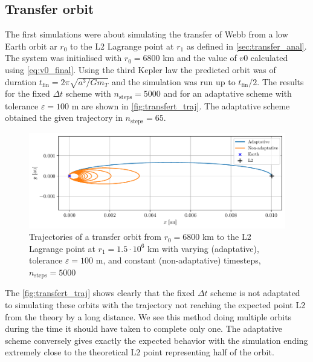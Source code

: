 \subsection{Transfer orbit}
The first simulations were about simulating the transfer of Webb from a low Earth orbit ar $r_0$ to the L2 Lagrange point at $r_1$ as defined in \autoref{sec:transfer_anal}. The system was initialised with \(r_0 = 6800\) km and the value of $v0$ calculated using \autoref{eq:v0_final}. Using the third Kepler law the predicted orbit was of duration $t_\mathrm{fin} = 2\pi\sqrt{a^3/Gm_T}$ and the simulation was run up to $t_\mathrm{fin}/2$. The results for the fixed $\Delta t$ scheme with $n_\mathrm{steps} = 5000$ and for an adaptative scheme with tolerance $\varepsilon = 100$ \si{\meter} are shown in \autoref{fig:transfert_traj}. The adaptative scheme obtained the given trajectory in $n_\mathrm{steps} = 65$.
\begin{figure}[h]
    \centering
    \includegraphics[width=\linewidth]{figures/transfert_comparaison.pdf}
    \caption{Trajectories of a transfer orbit from $r_0 = 6800$ \si{\kilo\meter} to the L2 Lagrange point at $r_1 = 1.5 \cdot 10^6$ \si{\kilo\meter} with varying (adaptative), tolerance $\varepsilon = 100$ \si{\meter}, and constant (non-adaptative) timesteps, $n_\mathrm{steps} = 5000$}
    \label{fig:transfert_traj}
\end{figure}

The \autoref{fig:transfert_traj} shows clearly that the fixed $\Delta t$ scheme is not adaptated to simulating these orbits with the trajectory not reaching the expected point L2 from the theory by a long distance. We see this method doing multiple orbits during the time it should have taken to complete only one. The adaptative scheme conversely gives exactly the expected behavior with the simulation ending extremely close to the theoretical L2 point representing half of the orbit.

